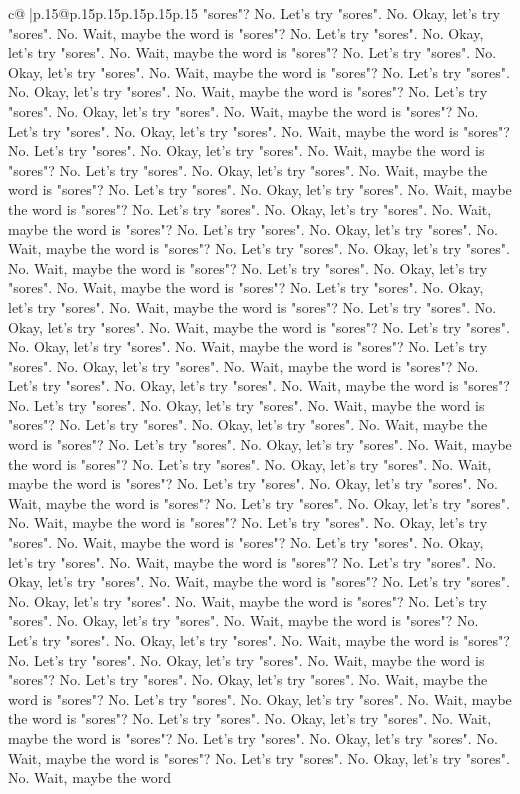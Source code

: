 \documentclass{article}
\begin{document}
{\begin{supertabular}{c@{$\;$}|p{.15\linewidth}@{}p{.15\linewidth}p{.15\linewidth}p{.15\linewidth}p{.15\linewidth}p{.15\linewidth}}
{{{"sores"? No. Let's try "sores". No. Okay, let's try "sores". No. Wait, maybe the word is "sores"? No. Let's try "sores". No. Okay, let's try "sores". No. Wait, maybe the word is "sores"? No. Let's try "sores". No. Okay, let's try "sores". No. Wait, maybe the word is "sores"? No. Let's try "sores". No. Okay, let's try "sores". No. Wait, maybe the word is "sores"? No. Let's try "sores". No. Okay, let's try "sores". No. Wait, maybe the word is "sores"? No. Let's try "sores". No. Okay, let's try "sores". No. Wait, maybe the word is "sores"? No. Let's try "sores". No. Okay, let's try "sores". No. Wait, maybe the word is "sores"? No. Let's try "sores". No. Okay, let's try "sores". No. Wait, maybe the word is "sores"? No. Let's try "sores". No. Okay, let's try "sores". No. Wait, maybe the word is "sores"? No. Let's try "sores". No. Okay, let's try "sores". No. Wait, maybe the word is "sores"? No. Let's try "sores". No. Okay, let's try "sores". No. Wait, maybe the word is "sores"? No. Let's try "sores". No. Okay, let's try "sores". No. Wait, maybe the word is "sores"? No. Let's try "sores". No. Okay, let's try "sores". No. Wait, maybe the word is "sores"? No. Let's try "sores". No. Okay, let's try "sores". No. Wait, maybe the word is "sores"? No. Let's try "sores". No. Okay, let's try "sores". No. Wait, maybe the word is "sores"? No. Let's try "sores". No. Okay, let's try "sores". No. Wait, maybe the word is "sores"? No. Let's try "sores". No. Okay, let's try "sores". No. Wait, maybe the word is "sores"? No. Let's try "sores". No. Okay, let's try "sores". No. Wait, maybe the word is "sores"? No. Let's try "sores". No. Okay, let's try "sores". No. Wait, maybe the word is "sores"? No. Let's try "sores". No. Okay, let's try "sores". No. Wait, maybe the word is "sores"? No. Let's try "sores". No. Okay, let's try "sores". No. Wait, maybe the word is "sores"? No. Let's try "sores". No. Okay, let's try "sores". No. Wait, maybe the word is "sores"? No. Let's try "sores". No. Okay, let's try "sores". No. Wait, maybe the word is "sores"? No. Let's try "sores". No. Okay, let's try "sores". No. Wait, maybe the word is "sores"? No. Let's try "sores". No. Okay, let's try "sores". No. Wait, maybe the word is "sores"? No. Let's try "sores". No. Okay, let's try "sores". No. Wait, maybe the word is "sores"? No. Let's try "sores". No. Okay, let's try "sores". No. Wait, maybe the word is "sores"? No. Let's try "sores". No. Okay, let's try "sores". No. Wait, maybe the word is "sores"? No. Let's try "sores". No. Okay, let's try "sores". No. Wait, maybe the word is "sores"? No. Let's try "sores". No. Okay, let's try "sores". No. Wait, maybe the word is "sores"? No. Let's try "sores". No. Okay, let's try "sores". No. Wait, maybe the word is "sores"? No. Let's try "sores". No. Okay, let's try "sores". No. Wait, maybe the word is "sores"? No. Let's try "sores". No. Okay, let's try "sores". No. Wait, maybe the word is "sores"? No. Let's try "sores". No. Okay, let's try "sores". No. Wait, maybe the word is "sores"? No. Let's try "sores". No. Okay, let's try "sores". No. Wait, maybe the word is "sores"? No. Let's try "sores". No. Okay, let's try "sores". No. Wait, maybe the word }}}
\end{supertabular}}
\end{document}
